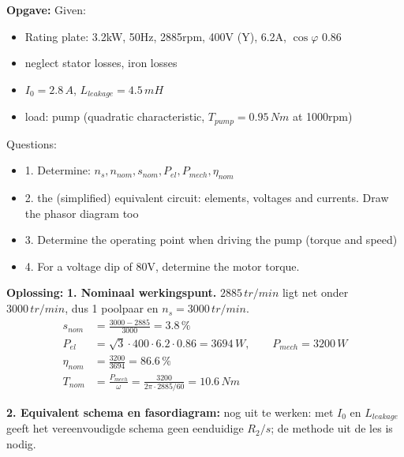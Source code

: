 \begin{oefenblok}
    \textbf{Opgave:}
    \newline
    Given:
    \begin{itemize}
     \item Rating plate: 3.2kW, 50Hz, 2885rpm, 400V (Y), 6.2A, $\cos\varphi$ 0.86
     \item neglect stator losses, iron losses
     \item $I_0=2.8\,A$, $L_{leakage}=4.5\,mH$
     \item load: pump (quadratic characteristic, $T_{pump}=0.95\,Nm$ at 1000rpm)
    \end{itemize}
    Questions:
    \begin{itemize}
     \item 1. Determine: $n_s, n_{nom}, s_{nom}, P_{el}, P_{mech}, \eta_{nom}$
     \item 2.
     the (simplified) equivalent circuit:
     elements, voltages and currents.
     Draw the phasor diagram too
     \item 3. Determine the operating point when driving the pump (torque and speed)
     \item 4. For a voltage dip of 80V, determine the motor torque.
    \end{itemize}
    \textbf{Oplossing:}
    \newline
        \textbf{1. Nominaal werkingspunt.}
    $2885\,tr/min$ ligt net onder $3000\,tr/min$, dus 1 poolpaar en $n_s = 3000\,tr/min$.
    \begin{align}
        s_{nom} &= \frac{3000 - 2885}{3000} = 3.8\,\% \tag{1} \\
        P_{el} &= \sqrt{3} \cdot 400 \cdot 6.2 \cdot 0.86 = 3694\,W, \qquad
        P_{mech} = 3200\,W \tag{2} \\
        \eta_{nom} &= \frac{3200}{3694} = 86.6\,\% \tag{3} \\
        T_{nom} &= \frac{P_{mech}}{\omega} = \frac{3200}{2\pi \cdot 2885/60} = 10.6\,Nm \tag{4}
    \end{align}

    \textbf{2. Equivalent schema en fasordiagram:}
    {\color{red}nog uit te werken: met $I_0$ en $L_{leakage}$ geeft het vereenvoudigde
    schema geen eenduidige $R_2/s$; de methode uit de les is nodig.}


\end{oefenblok}
